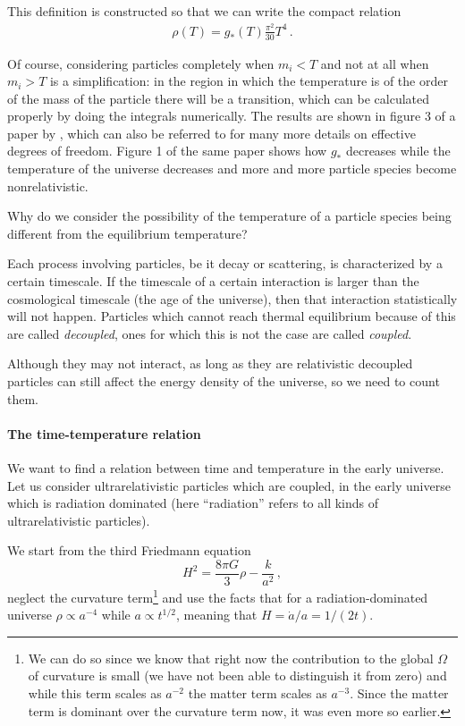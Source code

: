 \documentclass[main.tex]{subfiles}
\begin{document}
This definition is constructed so that we can write the compact relation 
%
\begin{align}
\rho (T) = g_*(T) \frac{\pi^2}{30} T^{4}
\,.
\end{align}

Of course, considering particles completely when \(m_i < T\) and not at all when \(m_i > T\) is a simplification: in the region in which the temperature is of the order of the mass of the particle there will be a transition, which can be calculated properly by doing the integrals numerically. The results are shown in figure 3 of a paper by \textcite[]{husdalEffectiveDegreesFreedom2016}, which can also be referred to for many more details on effective degrees of freedom.
Figure 1 of the same paper shows how \(g_*\) decreases while the temperature of the universe decreases and more and more particle species become nonrelativistic. 

Why do we consider the possibility of the temperature of a particle species being different from the equilibrium temperature?
 
Each process involving particles, be it decay or scattering, is characterized by a certain timescale.
If the timescale of a certain interaction is larger than the cosmological timescale (the age of the universe), then that interaction statistically will not happen.
Particles which cannot reach thermal equilibrium because of this are called \emph{decoupled}, ones for which this is not the case are called \emph{coupled}.

Although they may not interact, as long as they are relativistic decoupled particles can still affect the energy density of the universe, so we need to count them. 

\paragraph{The time-temperature relation}

We want to find a relation between time and temperature in the early universe.
Let us consider ultrarelativistic particles which are coupled, in the early universe which is radiation dominated (here ``radiation'' refers to all kinds of ultrarelativistic particles). 


We start from the third Friedmann equation
%
\begin{equation}
  H^2= \frac{8 \pi G}{3} \rho - \frac{k}{a^2}
\,,
\end{equation}
%
neglect the curvature term\footnote{We can do so since we know that right now the contribution to the global \(\Omega \) of curvature is small (we have not been able to distinguish it from zero) and while this term scales as \(a^{-2}\) the matter term scales as \(a^{-3}\). Since the matter term is dominant over the curvature term now, it was even more so earlier.} and use the facts that for a radiation-dominated universe \(\rho \propto a^{-4}\) while \(a \propto t^{1/2}\), meaning that \(H = \dot{a} / a =  1/ (2t)\).
\end{document}
